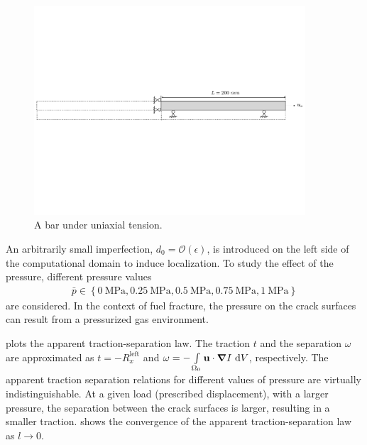 \begin{figure}[!ht]
  \centering
  \includegraphics[width=0.9\textwidth,trim={0 8cm 0 8cm},clip]{Chapter3/figures/bar}
  \caption{A bar under uniaxial tension.}
  \label{fig:bar}
\end{figure}

An arbitrarily small imperfection, $d_0 = \mathcal{O}(\epsilon)$, is introduced on the left side of the computational domain to induce localization.
To study the effect of the pressure, different pressure values
\begin{align*}
  \bar{p} \in \left\{ \SI{0}{\mega\pascal}, \SI{0.25}{\mega\pascal}, \SI{0.5}{\mega\pascal}, \SI{0.75}{\mega\pascal}, \SI{1}{\mega\pascal} \right\}
\end{align*}
are considered. In the context of fuel fracture, the pressure on the crack surfaces can result from a pressurized gas environment.



 plots the apparent traction-separation law. The traction $t$ and the separation $\omega$ are approximated as $t = -R_x^\text{left}$ and $\omega = - \int\limits_{\Omega_0} \textbf{u} \cdot \boldsymbol{\nabla} I \text{ d}V$, respectively. The apparent traction separation relations for different values of pressure are virtually indistinguishable. At a given load (prescribed displacement), with a larger pressure, the separation between the crack surfaces is larger, resulting in a smaller traction.  shows the convergence of the apparent traction-separation law as $l \to 0$.



